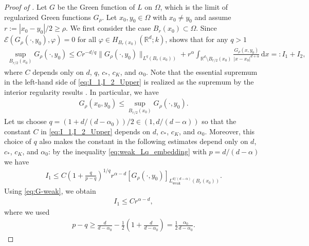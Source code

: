 \documentclass[reqno]{amsart}
\theoremstyle{plain}
\theoremstyle{definition}
\numberwithin{equation}{section}
\newcommand{\Rd}{\mathbb{R}^d}
\newcommand{\dx} {\, \mathrm{d}x}
\newcommand{\cl} {c_{\ast}}
\newcommand{\cK} {c_K}
\begin{document}
\begin{proof} [Proof of ]
Let $G$ be the Green function of $L$ on $\Omega$, which is the limit of regularized Green functions $G_{\rho}$. Let $x_0, y_0 \in \Omega$ with $x_0 \neq y_0$ and assume $r := | x_0 - y_0 |/2 \geq \rho$. We first consider the case $B_r(x_0) \subset \Omega$. Since $\mathcal{E}(G_{\rho}(\cdot, y_0), \varphi) = 0$ for all $\varphi \in H_{B_{r}(x_{0})}(\Rd; k)$,  shows that for any $q > 1$
\begin{align} \label{eq:I_1,I_2_Upper}
\sup_{B_{r/2}(x_0)} G_{\rho}(\cdot, y_0)
\leq C r^{-d/q} \|G_{\rho}(\cdot, y_0)\|_{L^q(B_r(x_0))} + r^\alpha \int_{\Rd \setminus B_{r/2}(x_0)} \frac{G_{\rho}(x, y_0)}{| x-x_0 |^{d+\alpha}} \dx
=: I_1 + I_2,
\end{align}
where $C$ depends only on $d$, $q$, $\cl$, $\cK$, and $\alpha_0$. Note that the essential supremum in the left-hand side of \eqref{eq:I_1,I_2_Upper} is
realized as the supremum by the interior regularity results \cite{KaWe22,DyKa20}. In particular, we have
\begin{align} \label{eq:sup}
G_{\rho}(x_0, y_0) \leq \sup_{B_{r/2}(x_0)} G_{\rho}(\cdot, y_0).
\end{align}
Let us choose $q = (1+d/(d-\alpha_0))/2 \in (1, d/(d-\alpha))$ 
so that the constant $C$ in \eqref{eq:I_1,I_2_Upper} depends on $d$, $\cl$, $\cK$, and $\alpha_0$.
Moreover, this choice of $q$ also makes the constant in the 
following estimates depend only on $d$, $\cl$, $\cK$, and $\alpha_0$: by the inequality \eqref{eq:weak_Lq_embedding} with $p=d/(d-\alpha)$ we have
\begin{align*}
I_1 \leq C \left( 1+ \frac{q}{p-q} \right)^{1/q} r^{\alpha-d} 
[G_{\rho}(\cdot, y_0)]_{L^{d/(d-\alpha)}_\mathrm{weak}(B_r(x_0))}.
\end{align*}
Using \eqref{eq:G-weak}, we obtain
\begin{align} \label{eq:I_1_Upper}
I_1 \leq C r^{\alpha-d},
\end{align}
where we used
\begin{align*}
p-q 
\geq \frac{d}{d-\alpha_0} - \frac{1}{2} \left( 1+\frac{d}{d-\alpha_0} \right) 
= \frac{1}{2} \frac{\alpha_0}{d-\alpha_0}.
\end{align*}


\end{proof}
\end{document}
